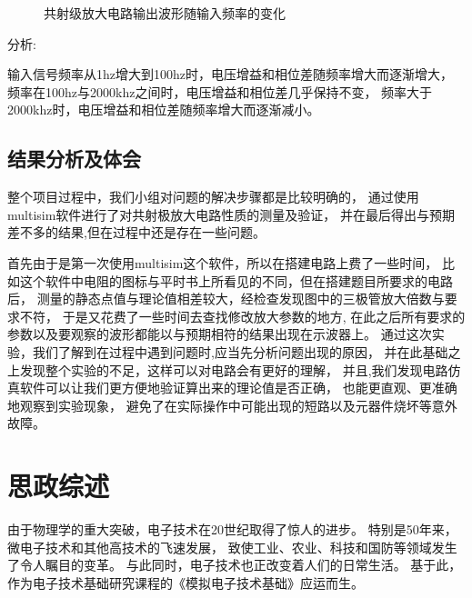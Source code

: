 \documentclass[10pt, conference, compsocconf, a4paper]{IEEEtran}
\begin{document}
\begin{figure}
   \label{5}\hfill
    \label{6}
  \caption{共射级放大电路输出波形随输入频率的变化}
  \label{fig1} 
\end{figure}


分析:\par
输入信号频率从1hz增大到100hz时，电压增益和相位差随频率增大而逐渐增大，
频率在100hz与2000khz之间时，电压增益和相位差几乎保持不变，
频率大于2000khz时，电压增益和相位差随频率增大而逐渐减小。

\subsection{结果分析及体会}
整个项目过程中，我们小组对问题的解决步骤都是比较明确的，
通过使用multisim软件进行了对共射极放大电路性质的测量及验证，
并在最后得出与预期差不多的结果,但在过程中还是存在一些问题。\par
首先由于是第一次使用multisim这个软件，所以在搭建电路上费了一些时间，
比如这个软件中电阻的图标与平时书上所看见的不同，但在搭建题目所要求的电路后，
测量的静态点值与理论值相差较大，经检查发现图中的三极管放大倍数与要求不符，
于是又花费了一些时间去查找修改放大参数的地方,
在此之后所有要求的参数以及要观察的波形都能以与预期相符的结果出现在示波器上。
通过这次实验，我们了解到在过程中遇到问题时,应当先分析问题出现的原因，
并在此基础之上发现整个实验的不足，这样可以对电路会有更好的理解，
并且,我们发现电路仿真软件可以让我们更方便地验证算出来的理论值是否正确，
也能更直观、更准确地观察到实验现象，
避免了在实际操作中可能出现的短路以及元器件烧坏等意外故障。

\section{思政综述}

由于物理学的重大突破，电子技术在20世纪取得了惊人的进步。
特别是50年来，微电子技术和其他高技术的飞速发展，
致使工业、农业、科技和国防等领域发生了令人瞩目的变革。
与此同时，电子技术也正改变着人们的日常生活。
基于此，作为电子技术基础研究课程的《模拟电子技术基础》应运而生。
\par
\end{document}
